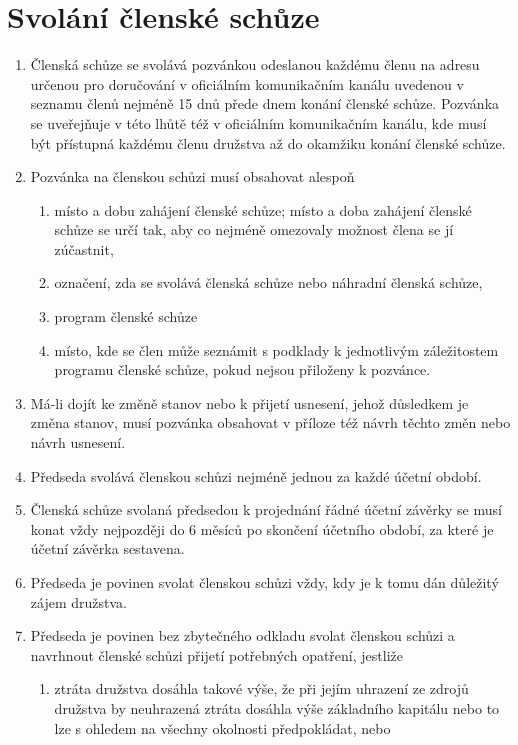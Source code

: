 \section{Svolání členské schůze}
\begin{enumerate}
    \item Členská schůze se svolává pozvánkou odeslanou každému členu na adresu určenou pro doručování v oficiálním komunikačním kanálu uvedenou v seznamu členů nejméně 15 dnů přede dnem konání členské schůze. Pozvánka se uveřejňuje v této lhůtě též v oficiálním komunikačním kanálu, kde musí být přístupná každému členu družstva až do okamžiku konání členské schůze.
    \item Pozvánka na členskou schůzi musí obsahovat alespoň
    \begin{enumerate}[label=\alph*.]
        \item místo a dobu zahájení členské schůze; místo a doba zahájení členské schůze se určí tak, aby co nejméně omezovaly možnost člena se jí zúčastnit,
        \item označení, zda se svolává členská schůze nebo náhradní členská schůze,
        \item program členské schůze
        \item místo, kde se člen může seznámit s podklady k jednotlivým záležitostem programu členské schůze, pokud nejsou přiloženy k pozvánce.
    \end{enumerate}
    \item Má-li dojít ke změně stanov nebo k přijetí usnesení, jehož důsledkem je změna stanov, musí pozvánka obsahovat v příloze též návrh těchto změn nebo návrh usnesení.
    \item Předseda svolává členskou schůzi nejméně jednou za každé účetní období.
    \item Členská schůze svolaná předsedou k projednání řádné účetní závěrky se musí konat vždy nejpozději do 6 měsíců po skončení účetního období, za které je účetní závěrka sestavena.
    \item Předseda je povinen svolat členskou schůzi vždy, kdy je k tomu dán důležitý zájem družstva.
    \item Předseda je povinen bez zbytečného odkladu svolat členskou schůzi a navrhnout členské schůzi přijetí potřebných opatření, jestliže
    \begin{enumerate}[label=\alph*.]
        \item ztráta družstva dosáhla takové výše, že při jejím uhrazení ze zdrojů družstva by neuhrazená ztráta dosáhla výše základního kapitálu nebo to lze s ohledem na všechny okolnosti předpokládat, nebo

\end{enumerate}
\end{enumerate}
